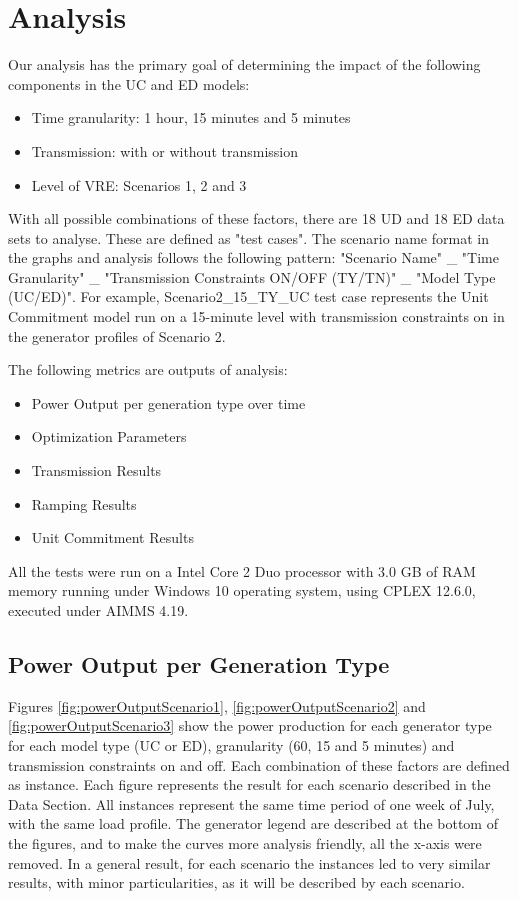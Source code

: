 \documentclass[12pt,LUDisStyle,twosided]{book}
\begin{document}
\chapter{Analysis}

Our analysis has the primary goal of determining the impact of the following components in the UC and ED models:

\begin{itemize}
\item Time granularity: 1 hour, 15 minutes and 5 minutes
\item Transmission: with or without transmission
\item Level of VRE: Scenarios 1, 2 and 3
\end{itemize}

With all possible combinations of these factors, there are 18 UD and 18 ED data sets to analyse. These are defined as "test cases". The scenario name format in the graphs and analysis follows the following pattern:
"Scenario Name" \_ "Time Granularity" \_ "Transmission Constraints ON/OFF (TY/TN)" \_ "Model Type (UC/ED)". For example, Scenario2\_15\_TY\_UC test case represents the Unit Commitment model run on a 15-minute level with transmission constraints on in the generator profiles of Scenario 2.

The following metrics are outputs of analysis:

\begin{itemize}
\item Power Output per generation type over time
\item Optimization Parameters
\item Transmission Results
\item Ramping Results
\item Unit Commitment Results
\end{itemize}

All the tests were run on a Intel Core 2 Duo processor with 3.0 GB of RAM memory running under Windows 10 operating system, using CPLEX 12.6.0, executed under AIMMS 4.19.


\section{Power Output per Generation Type}

Figures \ref{fig:powerOutputScenario1}, \ref{fig:powerOutputScenario2} and \ref{fig:powerOutputScenario3} show the power production for each generator type for each model type (UC or ED), granularity (60, 15 and 5 minutes) and transmission constraints on and off. Each combination of these factors are defined as instance. Each figure represents the result for each scenario described in the Data Section. All instances represent the same time period of one week of July, with the same load profile. The generator legend are described at the bottom of the figures, and to make the curves more analysis friendly, all the x-axis were removed. In a general result, for each scenario the instances led to very similar results, with minor particularities, as it will be described by each scenario.
\end{document}
